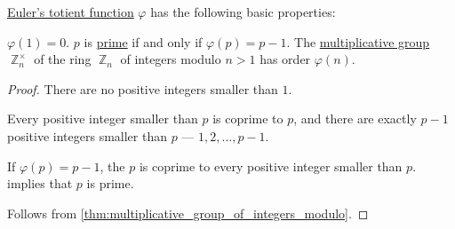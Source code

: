 \begin{proposition}\label{thm:def:eulers_totient_function}
  \hyperref[def:eulers_totient_function]{Euler's totient function} \( \varphi \) has the following basic properties:
  \begin{thmenum}
     \( \varphi(1) = 0 \).
     \( p \) is \hyperref[def:prime_number]{prime} if and only if \( \varphi(p) = p - 1 \).
     The \hyperref[def:semiring]{multiplicative group} \( \BbbZ_n^\times \) of the ring \hyperref[def:ring_of_integers_modulo]{\( \BbbZ_n \)} of integers modulo \( n > 1 \) has order \( \varphi(n) \).
  \end{thmenum}
\end{proposition}
\begin{proof}
   There are no positive integers smaller than \( 1 \).


  \SufficiencySubProof* Every positive integer smaller than \( p \) is coprime to \( p \), and there are exactly \( p - 1 \) positive integers smaller than \( p \) --- \( 1, 2, \ldots, p - 1 \).

  \NecessitySubProof* If \( \varphi(p) = p - 1 \), the \( p \) is coprime to every positive integer smaller than \( p \).  implies that \( p \) is prime.

   Follows from \cref{thm:multiplicative_group_of_integers_modulo}.
\end{proof}

